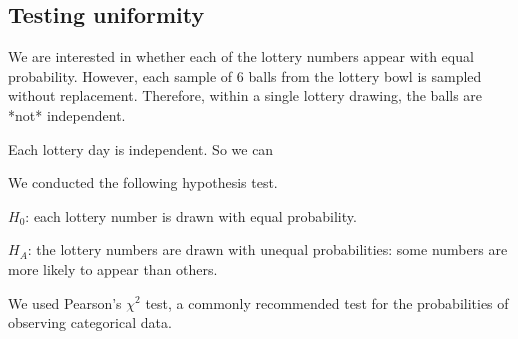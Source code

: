\subsection{Testing uniformity}



We are interested in whether each of the lottery numbers appear with equal probability.
However, each sample of 6 balls from the lottery bowl is sampled without replacement. 
Therefore, within a single lottery drawing, the balls are *not* independent. 

Each lottery day is independent. So we can 

We conducted the following hypothesis test.

$H_0$: each lottery number is drawn with equal probability.

$H_A$: the lottery numbers are drawn with unequal probabilities: some numbers are more likely to appear than others.

We used Pearson's $\chi^2$ test, a commonly recommended test for the probabilities of observing categorical data. 







